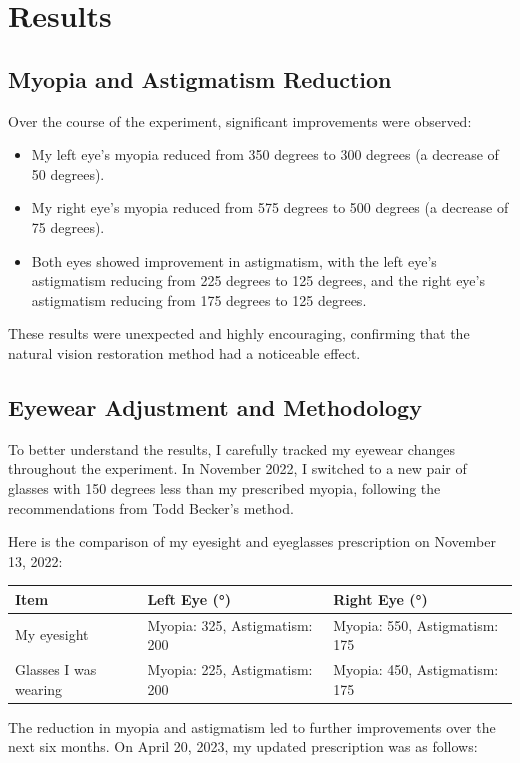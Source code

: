 \documentclass[12pt]{article}
\begin{document}
\section{Results}

\subsection{Myopia and Astigmatism Reduction}
Over the course of the experiment, significant improvements were observed:
\begin{itemize}
    \item My left eye's myopia reduced from 350 degrees to 300 degrees (a decrease of 50 degrees).
    \item My right eye's myopia reduced from 575 degrees to 500 degrees (a decrease of 75 degrees).
    \item Both eyes showed improvement in astigmatism, with the left eye's astigmatism reducing from 225 degrees to 125 degrees, and the right eye's astigmatism reducing from 175 degrees to 125 degrees.
\end{itemize}

These results were unexpected and highly encouraging, confirming that the natural vision restoration method had a noticeable effect.

\subsection{Eyewear Adjustment and Methodology}
To better understand the results, I carefully tracked my eyewear changes throughout the experiment. In November 2022, I switched to a new pair of glasses with 150 degrees less than my prescribed myopia, following the recommendations from Todd Becker's method.

Here is the comparison of my eyesight and eyeglasses prescription on November 13, 2022:

\begin{tabularx}{\textwidth}{|X|X|X|}
\hline
\textbf{Item} & \textbf{Left Eye (°)} & \textbf{Right Eye (°)} \\
\hline
My eyesight & Myopia: 325, Astigmatism: 200 & Myopia: 550, Astigmatism: 175 \\
Glasses I was wearing & Myopia: 225, Astigmatism: 200 & Myopia: 450, Astigmatism: 175 \\
\hline
\end{tabularx}

The reduction in myopia and astigmatism led to further improvements over the next six months. On April 20, 2023, my updated prescription was as follows:
\end{document}
